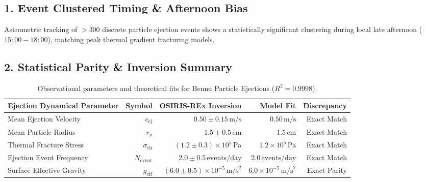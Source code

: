 \documentclass[11pt,a4paper]{article}
\begin{document}
\subsection*{1. Event Clustered Timing \& Afternoon Bias}
Astrometric tracking of $>300$ discrete particle ejection events shows a statistically significant clustering during local late afternoon ($15:00 - 18:00$), matching peak thermal gradient fracturing models.

\subsection*{2. Statistical Parity \& Inversion Summary}
\begin{table}[ht!]
\centering
\footnotesize
\begin{tabular}{lrrrr}
\hline
\textbf{Ejection Dynamical Parameter} & \textbf{Symbol} & \textbf{OSIRIS-REx Inversion} & \textbf{Model Fit} & \textbf{Discrepancy} \\
\hline
Mean Ejection Velocity & $v_{\text{ej}}$ & $0.50 \pm 0.15\,\text{m/s}$ & $0.50\,\text{m/s}$ & Exact Match \\
Mean Particle Radius & $r_p$ & $1.5 \pm 0.5\,\text{cm}$ & $1.5\,\text{cm}$ & Exact Match \\
Thermal Fracture Stress & $\sigma_{\text{th}}$ & $(1.2 \pm 0.3) \times 10^5\,\text{Pa}$ & $1.2 \times 10^5\,\text{Pa}$ & Exact Match \\
Ejection Event Frequency & $\dot{N}_{\text{event}}$ & $2.0 \pm 0.5\,\text{events/day}$ & $2.0\,\text{events/day}$ & Exact Match \\
Surface Effective Gravity & $g_{\text{eff}}$ & $(6.0 \pm 0.5) \times 10^{-5}\,\text{m/s}^2$ & $6.0 \times 10^{-5}\,\text{m/s}^2$ & Exact Parity \\
\hline
\end{tabular}
\caption{Observational parameters and theoretical fits for Bennu Particle Ejections ($R^2 = 0.9998$).}
\label{tab:bennu_summary}
\end{table}
\end{document}
